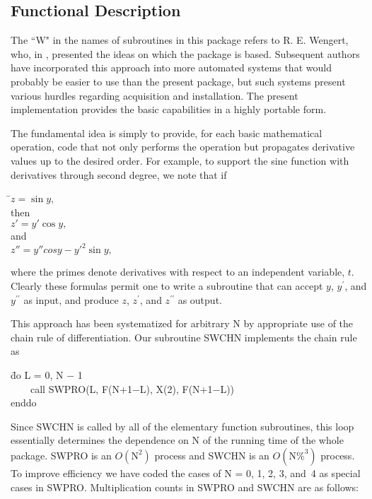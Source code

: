 \documentclass[twoside]{MATH77}
\begin{document}
\subsection{Functional Description}

The ``W" in the names of subroutines in this package refers to R.  E.
Wengert, who, in \cite{Wengert:1964:ASA}, presented the ideas on which the
package is based.  Subsequent authors have incorporated this approach into
more automated systems \cite{Griewank:1991:ADA} that would probably be
easier to use than the present package, but such systems present various
hurdles regarding acquisition and installation.  The present
implementation provides the basic capabilities in a highly portable form.

The fundamental idea is simply to provide, for each basic mathematical
operation, code that not only performs the operation but propagates
derivative values up to the desired order. For example, to support the sine
function with derivatives through second degree, we note that if

\begin{tabbing}
\hspace{.4in}\=$z = \sin y,$\\
then\\
\>$z'= y' \cos y,$\\
and\\
\>$z''= y'' cos y - {y'}^2 \sin y,$
\end{tabbing}

where the primes denote derivatives with respect to an independent variable,
$t$. Clearly these formulas permit one to write a subroutine that can accept $%
y$, $y^{\prime}$, and $y^{\prime \prime}$ as input, and
produce $z$, $z^{\prime}$, and $z^{\prime \prime}$
as output.

This approach has been systematized for arbitrary N by appropriate use of
the chain rule of differentiation. Our subroutine SWCHN implements the chain
rule as

\begin{tabbing}
\hspace{.2in}\=do L = 0, N $-$ 1\\
\>\ \ \ \ call SWPRO(L, F(N+1$-$L), X(2), F(N+1$-$L))\\
\>enddo
\end{tabbing}

Since SWCHN is called by all of the elementary function subroutines, this
loop essentially determines the dependence on N of the running time of the
whole package. SWPRO is an $O(\text{N}^2)$ process and SWCHN is an $O(\text{N%
}^3)$ process. To improve efficiency we have coded the cases of N = 0, 1, 2,
3, and~4 as special cases in SWPRO. Multiplication counts in SWPRO and SWCHN
are as follows:
\end{document}
